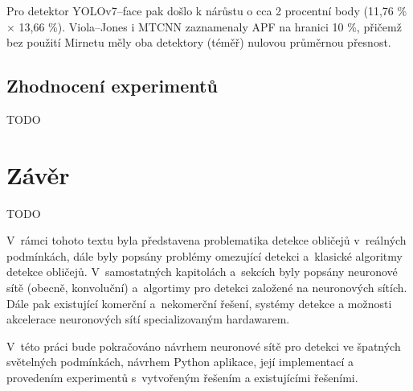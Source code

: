 Pro detektor YOLOv7--face pak došlo k nárůstu o cca 2 procentní body (11,76 \% $\times$ 13,66 \%). Viola--Jones i MTCNN zaznamenaly APF na hranici 10 \%, přičemž bez použití Mirnetu měly oba detektory (téměř) nulovou průměrnou přesnost.


\section{Zhodnocení experimentů}
\label{sekce:shnutiexperimentu}

TODO

\chapter{Závěr}
\label{kapitola:zaver}

TODO

V~rámci tohoto textu byla představena problematika detekce obličejů v~reálných podmínkách, dále byly popsány problémy omezující detekci a~klasické algoritmy detekce obličejů. V~samostatných kapitolách a~sekcích byly popsány neuronové sítě (obecně, konvoluční) a~algortimy pro detekci založené na neuronových sítích. Dále pak existující komerční a~nekomerční řešení, systémy detekce a možnosti akcelerace neuronových sítí specializovaným hardawarem.

V~této práci bude pokračováno návrhem neuronové sítě pro detekci ve špatných světelných podmínkách, návrhem Python aplikace, její implementací a provedením experimentů s~vytvořeným řešením a existujícími řešeními.